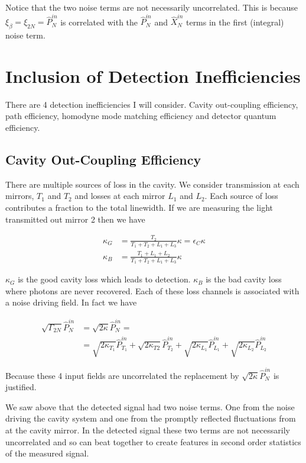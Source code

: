 \documentclass[12pt]{article}
\begin{document}
Notice that the two noise terms are not necessarily uncorrelated. This is because $\xi_{\beta} = \xi_{2N} = \hat{P}_{N}^{in}$ is correlated with the $\hat{P}_{N}^{in}$ and $\hat{X}_N^{in}$ terms in the first (integral) noise term.

\section{Inclusion of Detection Inefficiencies}

There are 4 detection inefficiencies I will consider. Cavity out-coupling efficiency, path efficiency, homodyne mode matching efficiency and detector quantum efficiency.

\subsection{Cavity Out-Coupling Efficiency}

There are multiple sources of loss in the cavity. We consider transmission at each mirrors, $T_1$ and $T_2$ and losses at each mirror $L_1$ and $L_2$. Each source of loss contributes a fraction to the total linewidth. If we are measuring the light transmitted out mirror 2 then we have

\begin{align}
\kappa_G &= \frac{T_2}{T_1+T_2+L_1+L_3} \kappa = \epsilon_C\kappa\\
\kappa_B &= \frac{T_1+L_1+L_2}{T_1+T_2+L_1+L_3} \kappa
\end{align}

$\kappa_G$ is the good cavity loss which leads to detection. $\kappa_B$ is the bad cavity loss where photons are never recovered. Each of these loss channels is associated with a noise driving field. In fact we have

\begin{align}
\sqrt{\Gamma_{2N}}\hat{P}_N^{in} &= \sqrt{2\kappa} \hat{P}_N^{in}=\\
&=\sqrt{2\kappa_{T_1}}\hat{P}_{T_1}^{in}+\sqrt{2\kappa_{T2}}\hat{P}_{T_2}^{in}+\sqrt{2\kappa_{L_1}}\hat{P}_{L_1}^{in}+\sqrt{2\kappa_{L_2}}\hat{P}_{L_2}^{in}
\end{align}

Because these 4 input fields are uncorrelated the replacement by $\sqrt{2\kappa}\hat{P}_N^{in}$ is justified.

We saw above that the detected signal had two noise terms. One from the noise driving the cavity system and one from the promptly reflected fluctuations from at the cavity mirror. In the detected signal these two terms are not necessarily uncorrelated and so can beat together to create features in second order statistics of the measured signal.
\end{document}
